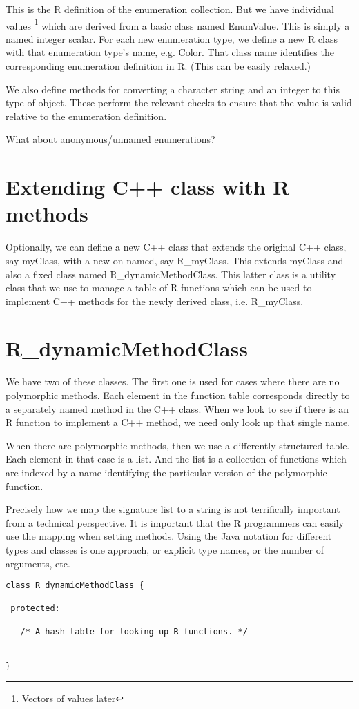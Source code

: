 \documentclass{article}
\begin{document}
This is the R definition of the enumeration collection.  But we have
individual values \footnote{Vectors of values later} which are derived
from a basic class named EnumValue.  This is simply a named integer
scalar.  For each new enumeration type, we define a new R class with
that enumeration type's name, e.g. Color.  That class name identifies
the corresponding enumeration definition in R. (This can be easily
relaxed.)

We also define methods for converting a character string and an
integer to this type of object.  These perform the relevant checks to
ensure that the value is valid relative to the enumeration definition.


What about anonymous/unnamed enumerations?

\section{Extending C++ class with R methods}
Optionally, we can define a new C++ class that extends the original
C++ class, say myClass, with a new on named, say R_myClass.  This
extends myClass and also a fixed class named R_dynamicMethodClass.
This latter class is a utility class that we use to manage a table of
R functions which can be used to implement C++ methods for the newly
derived class, i.e. R_myClass.



\section{R_dynamicMethodClass}

We have two of these classes.  The first one is used for cases where
there are no polymorphic methods. Each element in the function table
corresponds directly to a separately named method in the C++ class.
When we look to see if there is an R function to implement a C++
method, we need only look up that single name.

When there are polymorphic methods, then we use a differently
structured table.  Each element in that case is a list.  And the list
is a collection of functions which are indexed by a name identifying
the particular version of the polymorphic function.

Precisely how we map the signature list to a string is not
terrifically important from a technical perspective.  It is important
that the R programmers can easily use the mapping when setting
methods.  Using the Java notation for different types and classes is
one approach, or explicit type names, or the number of arguments, etc.


\begin{verbatim}
class R_dynamicMethodClass {

 protected:
 
   /* A hash table for looking up R functions. */

 
}
\end{verbatim}
\end{document}
